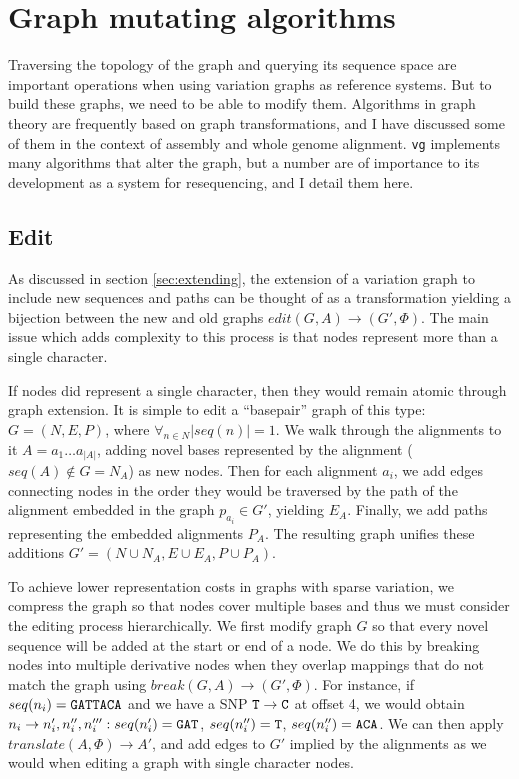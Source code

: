 \section{Graph mutating algorithms}

Traversing the topology of the graph and querying its sequence space are important operations when using variation graphs as reference systems.
But to build these graphs, we need to be able to modify them.
Algorithms in graph theory are frequently based on graph transformations, and I have discussed some of them in the context of assembly and whole genome alignment.
{\tt vg} implements many algorithms that alter the graph, but a number are of importance to its development as a system for resequencing, and I detail them here.

\subsection{Edit}

As discussed in section \ref{sec:extending}, the extension of a variation graph to include new sequences and paths can be thought of as a transformation yielding a bijection between the new and old graphs $edit(G, A) \to (G', \Phi)$.
The main issue which adds complexity to this process is that nodes represent more than a single character.

If nodes did represent a single character, then they would remain atomic through graph extension.
It is simple to edit a ``basepair'' graph of this type: $G = (N, E, P)$, where $\forall_{n \in N}{|seq(n)| = 1}$.
We walk through the alignments to it $A = a_1\ldots a_{|A|}$, adding novel bases represented by the alignment ($seq(A) \notin G = N_A$) as new nodes.
Then for each alignment $a_i$, we add edges connecting nodes in the order they would be traversed by the path of the alignment embedded in the graph $p_{a_i} \in G'$, yielding $E_A$.
Finally, we add paths representing the embedded alignments $P_A$.
The resulting graph unifies these additions $G' = (N \cup N_A, E \cup E_A, P \cup P_A)$.

To achieve lower representation costs in graphs with sparse variation, we compress the graph so that nodes cover multiple bases and thus we must consider the editing process hierarchically.
We first modify graph $G$ so that every novel sequence will be added at the start or end of a node.
We do this by breaking nodes into multiple derivative nodes when they overlap mappings that do not match the graph using $break(G, A) \to (G', \Phi)$.
For instance, if $seq(n_i) = {\tt GATTACA}$ and we have a SNP ${\tt T} \to {\tt C}$ at offset 4, we would obtain $n_i \to n_i', n_i'', n_i''' : seq(n_i') = {\tt GAT} $, $seq(n_i'') = {\tt T}$, $seq(n_i'') = {\tt ACA}$.
We can then apply $translate(A, \Phi) \to A'$, and add edges to $G'$ implied by the alignments as we would when editing a graph with single character nodes.

